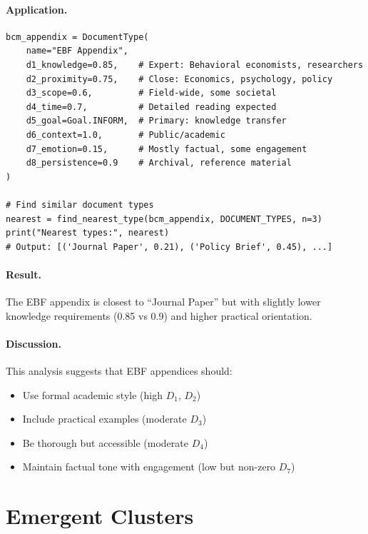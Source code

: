 \paragraph{Application.}

\begin{verbatim}
bcm_appendix = DocumentType(
    name="EBF Appendix",
    d1_knowledge=0.85,    # Expert: Behavioral economists, researchers
    d2_proximity=0.75,    # Close: Economics, psychology, policy
    d3_scope=0.6,         # Field-wide, some societal
    d4_time=0.7,          # Detailed reading expected
    d5_goal=Goal.INFORM,  # Primary: knowledge transfer
    d6_context=1.0,       # Public/academic
    d7_emotion=0.15,      # Mostly factual, some engagement
    d8_persistence=0.9    # Archival, reference material
)

# Find similar document types
nearest = find_nearest_type(bcm_appendix, DOCUMENT_TYPES, n=3)
print("Nearest types:", nearest)
# Output: [('Journal Paper', 0.21), ('Policy Brief', 0.45), ...]
\end{verbatim}

\paragraph{Result.} The EBF appendix is closest to ``Journal Paper'' but
with slightly lower knowledge requirements (0.85 vs 0.9) and higher practical
orientation.

\paragraph{Discussion.} This analysis suggests that EBF appendices should:
\begin{itemize}[nosep]
\item Use formal academic style (high $D_1$, $D_2$)
\item Include practical examples (moderate $D_3$)
\item Be thorough but accessible (moderate $D_4$)
\item Maintain factual tone with engagement (low but non-zero $D_7$)
\end{itemize}


\section{Emergent Clusters}
\label{sec:doctype-clusters}

